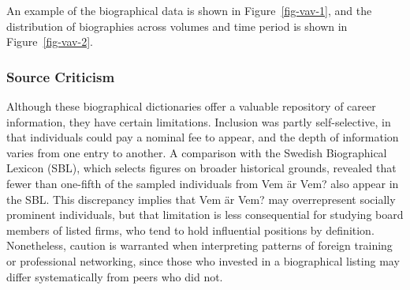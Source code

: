 \documentclass[
]{article}
\begin{document}
An example of the biographical data is shown in Figure~\ref{fig-vav-1},
and the distribution of biographies across volumes and time period is
shown in Figure~\ref{fig-vav-2}.

\subsubsection{Source Criticism}\label{source-criticism}

Although these biographical dictionaries offer a valuable repository of
career information, they have certain limitations. Inclusion was partly
self-selective, in that individuals could pay a nominal fee to appear,
and the depth of information varies from one entry to another. A
comparison with the Swedish Biographical Lexicon (SBL), which selects
figures on broader historical grounds, revealed that fewer than
one-fifth of the sampled individuals from Vem är Vem? also appear in the
SBL. This discrepancy implies that Vem är Vem? may overrepresent
socially prominent individuals, but that limitation is less
consequential for studying board members of listed firms, who tend to
hold influential positions by definition. Nonetheless, caution is
warranted when interpreting patterns of foreign training or professional
networking, since those who invested in a biographical listing may
differ systematically from peers who did not.
\end{document}
